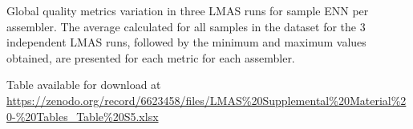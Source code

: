 \begin{table}[]
\centering
\caption{Global quality metrics variation in three LMAS runs for sample ENN per assembler. The average calculated for all samples in the dataset for the 3 independent LMAS runs, followed by the minimum and maximum values obtained, are presented for each metric for each assembler.}
\label{tab:ch5_suptable5}
Table available for download at \url{https://zenodo.org/record/6623458/files/LMAS\%20Supplemental\%20Material\%20-\%20Tables_Table\%20S5.xlsx}
\end{table}